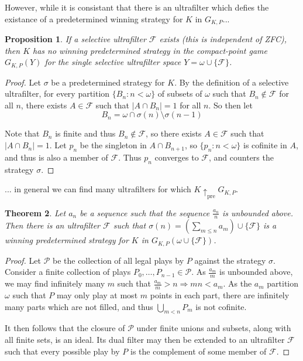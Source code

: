 \documentclass[11pt]{article}
\theoremstyle{plain}
\newtheorem{theorem}{Theorem}
\newtheorem{proposition}[theorem]{Proposition}
\theoremstyle{definition}
\theoremstyle{remark}
\newcommand{\prewin}{\uparrow_{\text{pre}}}
\begin{document}
However, while it is consistant that there is an ultrafilter which defies the existance of a predetermined winning strategy for $K$ in $G_{K,P}$...

\begin{proposition} 
If a selective ultrafilter $\mathcal{F}$ exists (this is independent of ZFC), then $K$ has no winning predetermined strategy in the compact-point game $G_{K,P}(Y)$ for the single selective ultrafilter space $Y=\omega \cup \{\mathcal{F}\}$.
\end{proposition}

\begin{proof}
Let $\sigma$ be a predetermined strategy for $K$. By the definition of a selective ultrafilter, for every partition $\{B_n : n < \omega\}$ of subsets of $\omega$ such that $B_n \not\in \mathcal{F}$ for all $n$, there exists $A \in \mathcal{F}$ such that $|A \cap B_n|=1$ for all $n$. So then let \[B_n = \omega \cap \sigma(n) \setminus \sigma(n-1)\]
  
Note that $B_n$ is finite and thus $B_n \not\in \mathcal{F}$, so there exists $A\in \mathcal{F}$ such that $|A \cap B_n|=1$. Let $p_n$ be the singleton in $A \cap B_{n+1}$, so $\{p_n : n < \omega\}$ is cofinite in $A$, and thus is also a member of $\mathcal{F}$. Thus $p_n$ converges to $\mathcal{F}$, and counters the strategy $\sigma$.
\end{proof}

... in general we can find many ultrafilters for which $K\prewin G_{K,P}$.

\begin{theorem}
Let $a_n$ be a sequence such that the sequence $\frac{a_n}{n}$ is unbounded above. Then there is an ultrafilter $\mathcal{F}$ such that $\sigma(n)=(\sum_{m\leq n} a_m )\cup \{\mathcal{F}\}$ is a winning predetermined strategy for $K$ in $G_{K,P}(\omega\cup\{\mathcal{F}\})$.
\end{theorem}

\begin{proof}
Let $\mathcal{P}$ be the collection of all legal plays by $P$ against the strategy $\sigma$. Consider a finite collection of plays $P_0,\dots,P_{n-1}\in \mathcal{P}$. As $\frac{a_m}{m}$ is unbounded above, we may find infinitely many $m$ such that $\frac{a_m}{m}>n \Rightarrow mn<a_m$. As the $a_m$ partition $\omega$ such that $P$ may only play at most $m$ points in each part, there are infinitely many parts which are not filled, and thus $\bigcup_{m<n} P_m$ is not cofinite.

It then follows that the closure of $\mathcal{P}$ under finite unions and subsets, along with all finite sets, is an ideal. Its dual filter may then be extended to an ultrafilter $\mathcal{F}$ such that every possible play by $P$ is the complement of some member of $\mathcal{F}$.
\end{proof}
\end{document}
